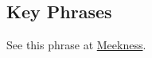\subsection{Key Phrases} %
	\label{LOWLINESS-PHRASES}

	\begin{compactdesc}
		\item[meek and lowly] See this phrase at \hyperref[MEEKNESS-PHRASES]{Meekness}.
	\end{compactdesc}
	


	
	
	
